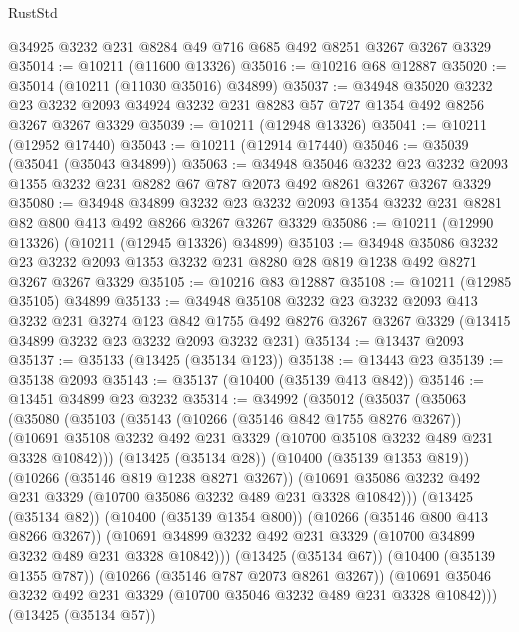 \begin{lexlean}{RustStd}
\begin{coremodule}
{\begin{coremodule}
{{{{{{{{{{{{{{{{{{{{{{{{{    @34925
    @3232
    @231
    @8284
    @49
    @716
    @685
    @492
    @8251
    @3267
    @3267
    @3329
@35014 := @10211 (@11600 @13326)
@35016 := @10216 @68 @12887
@35020 := @35014 (@10211 (@11030 @35016) @34899)
@35037 := @34948
    @35020
    @3232
    @23
    @3232
    @2093
    @34924
    @3232
    @231
    @8283
    @57
    @727
    @1354
    @492
    @8256
    @3267
    @3267
    @3329
@35039 := @10211 (@12948 @13326)
@35041 := @10211 (@12952 @17440)
@35043 := @10211 (@12914 @17440)
@35046 := @35039 (@35041 (@35043 @34899))
@35063 := @34948
    @35046
    @3232
    @23
    @3232
    @2093
    @1355
    @3232
    @231
    @8282
    @67
    @787
    @2073
    @492
    @8261
    @3267
    @3267
    @3329
@35080 := @34948
    @34899
    @3232
    @23
    @3232
    @2093
    @1354
    @3232
    @231
    @8281
    @82
    @800
    @413
    @492
    @8266
    @3267
    @3267
    @3329
@35086 := @10211 (@12990 @13326) (@10211 (@12945 @13326) @34899)
@35103 := @34948
    @35086
    @3232
    @23
    @3232
    @2093
    @1353
    @3232
    @231
    @8280
    @28
    @819
    @1238
    @492
    @8271
    @3267
    @3267
    @3329
@35105 := @10216 @83 @12887
@35108 := @10211 (@12985 @35105) @34899
@35133 := @34948
    @35108
    @3232
    @23
    @3232
    @2093
    @413
    @3232
    @231
    @3274
    @123
    @842
    @1755
    @492
    @8276
    @3267
    @3267
    @3329
    (@13415 @34899 @3232 @23 @3232 @2093 @3232 @231)
@35134 := @13437 @2093
@35137 := @35133 (@13425 (@35134 @123))
@35138 := @13443 @23
@35139 := @35138 @2093
@35143 := @35137 (@10400 (@35139 @413 @842))
@35146 := @13451 @34899 @23 @3232
@35314 := @34992
    (@35012
      (@35037
        (@35063
          (@35080
            (@35103
              (@35143
                (@10266 (@35146 @842 @1755 @8276 @3267))
                (@10691 @35108 @3232 @492 @231 @3329 (@10700 @35108 @3232 @489 @231 @3328 @10842)))
              (@13425 (@35134 @28))
              (@10400 (@35139 @1353 @819))
              (@10266 (@35146 @819 @1238 @8271 @3267))
              (@10691 @35086 @3232 @492 @231 @3329 (@10700 @35086 @3232 @489 @231 @3328 @10842)))
            (@13425 (@35134 @82))
            (@10400 (@35139 @1354 @800))
            (@10266 (@35146 @800 @413 @8266 @3267))
            (@10691 @34899 @3232 @492 @231 @3329 (@10700 @34899 @3232 @489 @231 @3328 @10842)))
          (@13425 (@35134 @67))
          (@10400 (@35139 @1355 @787))
          (@10266 (@35146 @787 @2073 @8261 @3267))
          (@10691 @35046 @3232 @492 @231 @3329 (@10700 @35046 @3232 @489 @231 @3328 @10842)))
        (@13425 (@35134 @57))
}}}}}}}}}}}}}}}}}}}}}}}}}
\end{coremodule}}
\end{coremodule}
\end{lexlean}
